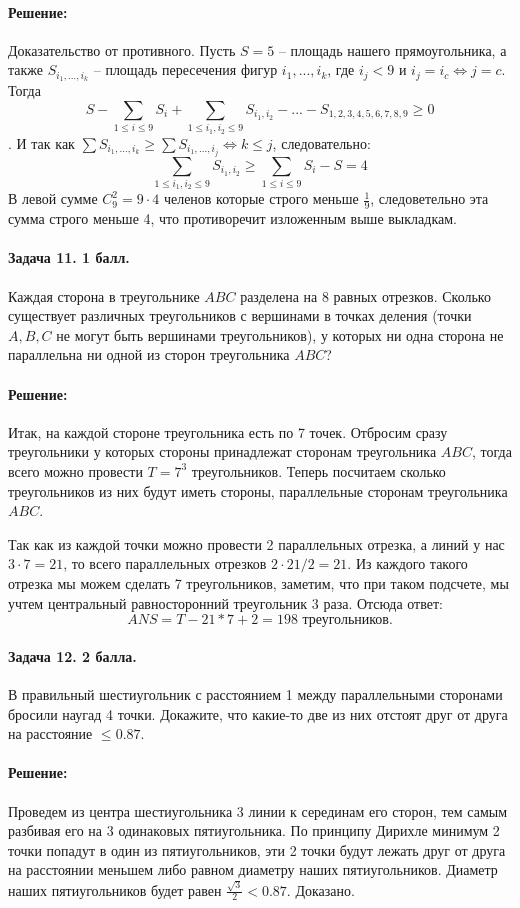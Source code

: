 \documentclass[12pt]{article}
\begin{document}
\paragraph{\bf Решение:}
Доказательство от противного. Пусть $ S = 5 $ -- площадь нашего прямоугольника, а также $ S_{i_1, ..., i_k} $ -- площадь пересечения
фигур $ i_1, ..., i_k $, где $ i_j < 9 \text{ и } i_j = i_c \Leftrightarrow j = c $. Тогда
$$ S - \sum\limits_{1 \le i \le 9} S_i + \sum\limits_{1 \le i_1, i_2 \le 9} S_{i_1, i_2} - ... - S_{1,2,3,4,5,6,7,8,9} \ge 0 $$.
И так как $\sum S_{i_1, ..., i_k} \ge \sum S_{i_1, ..., i_j} \Leftrightarrow k \le j$, следовательно:
$$
\sum\limits_{1 \le i_1, i_2 \le 9} S_{i_1, i_2} \ge \sum\limits_{1 \le i \le 9} S_i - S = 4
$$
В левой сумме $ C_9^2 = 9\cdot4 $ челенов которые строго меньше $ \frac{1}{9} $, 
следоветельно эта сумма строго меньше 4, что противоречит изложенным выше выкладкам.

\paragraph{Задача 11. 1 балл.} Каждая сторона в треугольнике $ ABC $ разделена на 8
равных отрезков. Сколько существует различных треугольников с вершинами в 
точках деления (точки $ A,B,C $ не могут быть вершинами треугольников), у 
которых ни одна сторона не параллельна ни одной из сторон треугольника $ ABC $?

\paragraph{\bf Решение:}
Итак, на каждой стороне треугольника есть по 7 точек. Отбросим сразу треугольники у которых
стороны принадлежат сторонам треугольника $ ABC $, тогда всего можно провести $ T = 7^3 $ треугольников.
Теперь посчитаем сколько треугольников из них будут иметь стороны, параллельные сторонам треугольника $ ABC $.

Так как из каждой точки можно провести 2 параллельных отрезка, а линий у нас $ 3\cdot7 = 21 $, то всего параллельных
отрезков $ 2\cdot 21 / 2 = 21 $. Из каждого такого отрезка мы можем сделать 7 треугольников, 
заметим, что при таком подсчете, мы учтем центральный равносторонний треугольник 3 раза. Отсюда ответ:
$$
ANS = T - 21 * 7 + 2 = 198 \text{ треугольников.}
$$

\paragraph{Задача 12. 2 балла.} В правильный шестиугольник с расстоянием 1 между 
параллельными сторонами бросили наугад 4 точки. Докажите, что какие-то две 
из них отстоят друг от друга на расстояние $ \le 0.87 $. 

\paragraph{\bf Решение:}
Проведем из центра шестиугольника 3 линии к серединам его сторон, тем самым разбивая его на
3 одинаковых пятиугольника. По принципу Дирихле минимум 2 точки попадут в один из пятиугольников,
эти 2 точки будут лежать друг от друга на расстоянии меньшем либо равном диаметру наших пятиугольников.
Диаметр наших пятиугольников будет равен $\frac{\sqrt{3}}{2} < 0.87$. Доказано.
\end{document}
